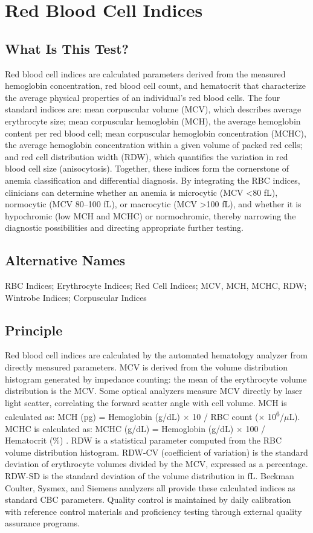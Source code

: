 \chapter{Red Blood Cell Indices}

\section*{What Is This Test?}
Red blood cell indices are calculated parameters derived from the measured hemoglobin concentration, red blood cell count, and hematocrit that characterize the average physical properties of an individual's red blood cells. The four standard indices are: mean corpuscular volume (MCV), which describes average erythrocyte size; mean corpuscular hemoglobin (MCH), the average hemoglobin content per red blood cell; mean corpuscular hemoglobin concentration (MCHC), the average hemoglobin concentration within a given volume of packed red cells; and red cell distribution width (RDW), which quantifies the variation in red blood cell size (anisocytosis). Together, these indices form the cornerstone of anemia classification and differential diagnosis. By integrating the RBC indices, clinicians can determine whether an anemia is microcytic (MCV <80 fL), normocytic (MCV 80--100 fL), or macrocytic (MCV >100 fL), and whether it is hypochromic (low MCH and MCHC) or normochromic, thereby narrowing the diagnostic possibilities and directing appropriate further testing.

\section*{Alternative Names}
RBC Indices; Erythrocyte Indices; Red Cell Indices; MCV, MCH, MCHC, RDW; Wintrobe Indices; Corpuscular Indices

\section*{Principle}
Red blood cell indices are calculated by the automated hematology analyzer from directly measured parameters. MCV is derived from the volume distribution histogram generated by impedance counting: the mean of the erythrocyte volume distribution is the MCV. Some optical analyzers measure MCV directly by laser light scatter, correlating the forward scatter angle with cell volume. MCH is calculated as: MCH (pg) = Hemoglobin (g/dL)  $\times$ 10 /  RBC count  ($\times$ 10\textsuperscript{6}/$\mu$L). MCHC is calculated as: MCHC (g/dL) = Hemoglobin (g/dL)  $\times$ 100 /  Hematocrit (\%) . RDW is a statistical parameter computed from the RBC volume distribution histogram. RDW-CV (coefficient of variation) is the standard deviation of erythrocyte volumes divided by the MCV, expressed as a percentage. RDW-SD is the standard deviation of the volume distribution in fL. Beckman Coulter, Sysmex, and Siemens analyzers all provide these calculated indices as standard CBC parameters. Quality control is maintained by daily calibration with reference control materials and proficiency testing through external quality assurance programs.

